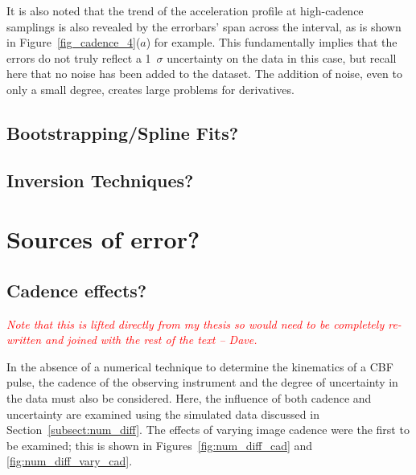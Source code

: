 \documentclass[structabstract]{aa}
\begin{document}
It is also noted that the trend of the acceleration profile at high-cadence samplings is also revealed by the errorbars' span across the interval, as is shown in Figure~\ref{fig_cadence_4}($a$) for example. This fundamentally implies that the errors do not truly reflect a 1~$\sigma$ uncertainty on the data in this case, but recall here that no noise has been added to the dataset. The addition of noise, even to only a small degree, creates large problems for derivatives.

\subsection{Bootstrapping/Spline Fits?}

\subsection{Inversion Techniques?}

\section{Sources of error?}

\subsection{Cadence effects?}

\emph{\textcolor{red}{Note that this is lifted directly from my thesis so would need to be completely re-written and joined with the rest of the text -- Dave.}}

In the absence of a numerical technique to determine the kinematics of a CBF pulse, the cadence of the observing instrument and the degree of uncertainty in the data must also be considered. Here, the influence of both cadence and uncertainty are examined using the simulated data discussed in Section~\ref{subsect:num_diff}. The effects of varying image cadence were the first to be examined; this is shown in Figures~\ref{fig:num_diff_cad} and \ref{fig:num_diff_vary_cad}. 
\end{document}
